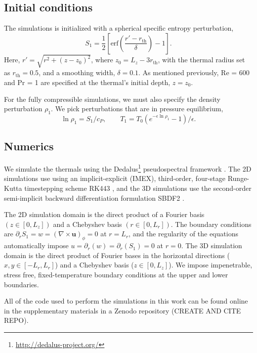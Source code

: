 \documentclass[twocolumn, amsmath, amsfonts, amssymb, trackchanges]{aastex62}
\newcommand{\grad}{\ensuremath{\nabla}}
\begin{document}
\subsection{Initial conditions}
The simulations is initialized with a spherical specific entropy perturbation,
\begin{equation}
S_1 = \frac{1}{2}\left[\text{erf}\left(\frac{r' - r_{\text{th}}}{\delta}\right) - 1\right].
\label{eqn:thermal_IC}
\end{equation}
Here, $r' = \sqrt{r^2 + (z - z_0)^2}$, where $z_0 = L_z - 3r_{\text{th}}$, with the thermal radius set as $r_{\text{th}} = 0.5$, and a smoothing width, $\delta = 0.1$.
As mentioned previously, Re = 600 and Pr = 1 are specified at the thermal's initial depth, $z = z_0$.

For the fully compressible simulations, we must also specify the density perturbation $\rho_1$.
We pick perturbations that are in pressure equilibrium,
\begin{equation}
\ln\rho_1 = S_1/c_P, \qquad T_1 = T_0(e^{-\epsilon\ln\rho_1} - 1)/\epsilon.
\end{equation}


\subsection{Numerics}
We simulate the thermals using the  Dedalus\footnote{\url{http://dedalus-project.org/}} pseudospectral framework \citep{burns&all2016, burns&all2019}.
The 2D simulations use using an implicit-explicit (IMEX), third-order, four-stage Runge-Kutta timestepping scheme RK443 \citep{ascher&all1997}, and the 3D simulations use the second-order semi-implicit backward differentiation formulation SBDF2 \citep{wang&ruuth2008}.

The 2D simulation domain is the direct product of a Fourier basis $(z \in [0, L_z])$ and a Chebyshev basis $(r \in [0, L_r])$.
The boundary conditions are $\partial_r S_1 = w = (\grad\times\bm{u})_\phi = 0$ at $r = L_r$, and the regularity of the equations automatically impose $u = \partial_r(w) = \partial_r(S_1) = 0$ at $r = 0$.
The 3D simulation domain is the direct product of Fourier bases in the horizontal directions ($x, y \in [-L_r, L_r]$) and a Chebyshev basis ($z \in [0, L_z]$).
We impose impenetrable, stress free, fixed-temperature boundary conditions at the upper and lower boundaries.

All of the code used to perform the simulations in this work can be found online in the supplementary materials in a Zenodo repository (CREATE AND CITE REPO).
\end{document}
